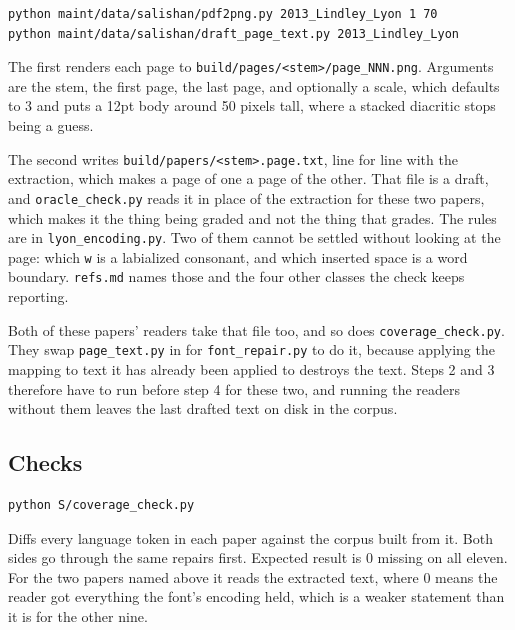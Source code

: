 \begin{lstlisting}[breaklines=true,breakatwhitespace=false,basicstyle=\ttfamily\small]
python maint/data/salishan/pdf2png.py 2013_Lindley_Lyon 1 70
python maint/data/salishan/draft_page_text.py 2013_Lindley_Lyon
\end{lstlisting}

The first renders each page to \texttt{build/\allowbreak{}pages/\allowbreak{}<stem>/\allowbreak{}page\_\allowbreak{}NNN.\allowbreak{}png}. Arguments are the stem, the first page, the last page, and optionally a scale, which defaults to 3 and puts a 12pt body around 50 pixels tall, where a stacked diacritic stops being a guess.

The second writes \texttt{build/\allowbreak{}papers/\allowbreak{}<stem>.\allowbreak{}page.\allowbreak{}txt}, line for line with the extraction, which makes a page of one a page of the other. That file is a draft, and \texttt{oracle\_\allowbreak{}check.\allowbreak{}py} reads it in place of the extraction for these two papers, which makes it the thing being graded and not the thing that grades. The rules are in \texttt{lyon\_\allowbreak{}encoding.\allowbreak{}py}. Two of them cannot be settled without looking at the page: which \texttt{w} is a labialized consonant, and which inserted space is a word boundary. \texttt{refs.\allowbreak{}md} names those and the four other classes the check keeps reporting.

Both of these papers' readers take that file too, and so does \texttt{coverage\_\allowbreak{}check.\allowbreak{}py}. They swap \texttt{page\_\allowbreak{}text.\allowbreak{}py} in for \texttt{font\_\allowbreak{}repair.\allowbreak{}py} to do it, because applying the mapping to text it has already been applied to destroys the text. Steps 2 and 3 therefore have to run before step 4 for these two, and running the readers without them leaves the last drafted text on disk in the corpus.

\subsection{Checks}

\begin{lstlisting}[breaklines=true,breakatwhitespace=false,basicstyle=\ttfamily\small]
python S/coverage_check.py
\end{lstlisting}

Diffs every language token in each paper against the corpus built from it. Both sides go through the same repairs first. Expected result is 0 missing on all eleven. For the two papers named above it reads the extracted text, where 0 means the reader got everything the font's encoding held, which is a weaker statement than it is for the other nine.

